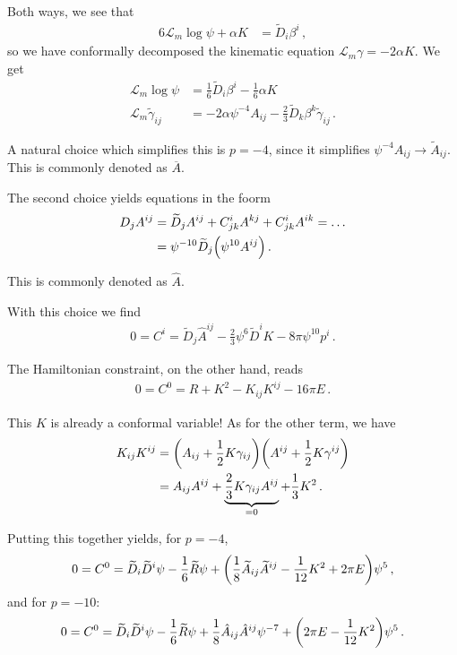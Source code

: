 \documentclass[main.tex]{subfiles}
\begin{document}
Both ways, we see that 
%
\begin{align}
6 \mathscr{L}_m \log \psi + \alpha K &= \widetilde{D}_i \beta^{i}
\,,
\end{align}
%
so we have conformally decomposed the kinematic equation \(\mathscr{L}_m \gamma = - 2 \alpha K\).
We get 
%
\begin{align}
\mathscr{L}_m \log \psi &= \frac{1}{6} \widetilde{D}_{i} \beta^{i}  - \frac{1}{6} \alpha K  \\
\mathscr{L}_m \widetilde{\gamma}_{ij} &= - 2 \alpha \psi^{-4} A_{ij} - \frac{2}{3} \widetilde{D}_{k} \beta^{k} \widetilde{\gamma}_{ij} 
\,.
\end{align}

A natural choice which simplifies this is \(p=-4\), since it simplifies \(\psi^{-4} A_{ij} \to \widetilde{A}_{ij}\). 
This is commonly denoted as \(\overline{A}\).

The second choice yields equations in the foorm 
%
\begin{align}
D_j A^{ij} &= \widetilde{D}_{j} A^{ij} + C^{i}_{jk} A^{kj} + C^{i}_{jk} A^{ik} = \dots  \\
&= \psi^{-10} \widetilde{D}_{j} \qty(\psi^{10} A^{ij})
\,.
\end{align}

This is commonly denoted as \(\hat{A}\).

With this choice we find 
%
\begin{align}
0 = C^{i} = \widetilde{D}_{j} \hat{A}^{ij}
- \frac{2}{3} \psi^{6} \widetilde{D}^{i} K 
- 8 \pi \psi^{10} p^{i}
\,.
\end{align}

The Hamiltonian constraint, on the other hand, reads 
%
\begin{align}
0 = C^{0} = R + K^2 - K_{ij} K^{ij} - 16 \pi E
\,.
\end{align}

This \(K\) is already a conformal variable! 
As for the other term, we have 
%
\begin{align}
K_{ij} K^{ij} &= \qty(A_{ij} + \frac{1}{2} K \gamma_{ij})
\qty(A^{ij} + \frac{1}{2} K \gamma^{ij})  \\
&= A_{ij} A^{ij} + \underbrace{\frac{2}{3} K \gamma_{ij} A^{ij}}_{= 0} + \frac{1}{3} K^2 
\,.
\end{align}

Putting this together yields, for \(p = -4\), 
%
\begin{align}
0 = C^{0} = \widetilde{D}_{i} \widetilde{D}^{i} \psi 
- \frac{1}{6} \widetilde{R} \psi + 
\qty( \frac{1}{8} \widetilde{A}_{ij} \widetilde{A}^{ij} - \frac{1}{12} K^2 + 2 \pi E) \psi^{5}
\,,
\end{align}
%
and for \(p = -10\): 
%
\begin{align}
0 = C^{0} = \widetilde{D}_{i} \widetilde{D}^{i} \psi - \frac{1}{6}
\widetilde{R} \psi + \frac{1}{8} \hat{A}_{ij} \hat{A}^{ij} \psi^{-7} 
+ \qty( 2 \pi E - \frac{1}{12} K^2 )\psi^{5} 
\,.
\end{align}
\end{document}
